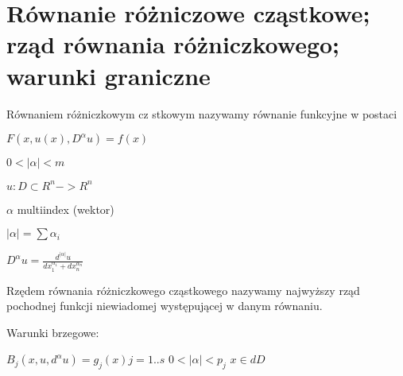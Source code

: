\section{Równanie różniczowe cząstkowe; rząd równania różniczkowego; warunki graniczne}
Równaniem różniczkowym cz
stkowym nazywamy równanie funkcyjne w postaci

$F(x ,u(x) , D^\alpha u) = f(x)$

$0<|\alpha| < m$

$u:D \subset R^n -> R^n$

$\alpha$ multiindex (wektor)

$|\alpha| = \sum \alpha_i$

$D^\alpha u = \frac{d^{|\alpha|} u}{dx_1^{\alpha_1} + dx_n^{\alpha_n}}$


Rzędem równania różniczkowego cząstkowego nazywamy najwyższy rząd pochodnej funkcji niewiadomej występującej w danym równaniu. 

Warunki brzegowe:

$ B_j(x,u,d^\alpha u) = g_j(x) j=1 .. s $
$ 0 < |\alpha| < p_j$
$x \in dD$